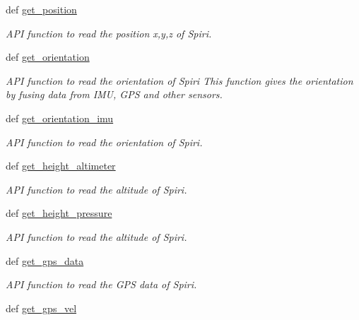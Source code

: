 \begin{DoxyCompactItemize}
\item 
def \hyperlink{classspiri__api_1_1get__state_1_1_staterobot_acaa2d63d3153f862a5752ebb75f51a23}{get\-\_\-position}
\begin{DoxyCompactList}\small\item\em A\-P\-I function to read the position x,y,z of Spiri. \end{DoxyCompactList}\item 
def \hyperlink{classspiri__api_1_1get__state_1_1_staterobot_ab8646e99f523f709242d7079a184057e}{get\-\_\-orientation}
\begin{DoxyCompactList}\small\item\em A\-P\-I function to read the orientation of Spiri This function gives the orientation by fusing data from I\-M\-U, G\-P\-S and other sensors. \end{DoxyCompactList}\item 
def \hyperlink{classspiri__api_1_1get__state_1_1_staterobot_a841fe6f1d8d15f7c1aa3022eea33ccdd}{get\-\_\-orientation\-\_\-imu}
\begin{DoxyCompactList}\small\item\em A\-P\-I function to read the orientation of Spiri. \end{DoxyCompactList}\item 
def \hyperlink{classspiri__api_1_1get__state_1_1_staterobot_ac0a65631dbe7edbf353799ca0faab408}{get\-\_\-height\-\_\-altimeter}
\begin{DoxyCompactList}\small\item\em A\-P\-I function to read the altitude of Spiri. \end{DoxyCompactList}\item 
def \hyperlink{classspiri__api_1_1get__state_1_1_staterobot_a9a2667a1295e2b9731614271eb021299}{get\-\_\-height\-\_\-pressure}
\begin{DoxyCompactList}\small\item\em A\-P\-I function to read the altitude of Spiri. \end{DoxyCompactList}\item 
def \hyperlink{classspiri__api_1_1get__state_1_1_staterobot_a1e11c48e95eb0184924776fdbc55b45b}{get\-\_\-gps\-\_\-data}
\begin{DoxyCompactList}\small\item\em A\-P\-I function to read the G\-P\-S data of Spiri. \end{DoxyCompactList}\item 
def \hyperlink{classspiri__api_1_1get__state_1_1_staterobot_af029d50c1f24e86ebfa2aa12d32d9501}{get\-\_\-gps\-\_\-vel}

\end{DoxyCompactItemize}
